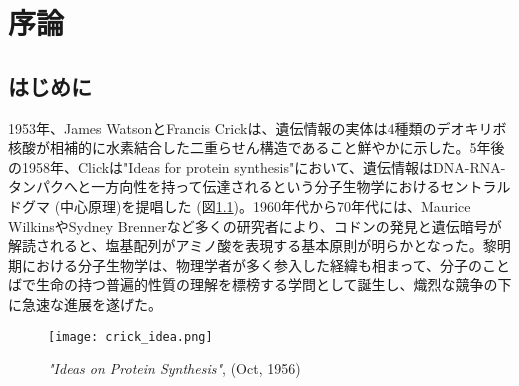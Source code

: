 \chapter{序論}

\section{はじめに}
1953年、James WatsonとFrancis Crickは、遺伝情報の実体は4種類のデオキリボ核酸が相補的に水素結合した二重らせん構造であること鮮やかに示した。5年後の1958年、Clickは"Ideas for protein synthesis"において、遺伝情報はDNA-RNA-タンパクへと一方向性を持って伝達されるという分子生物学におけるセントラルドグマ (中心原理)を提唱した (図\ref{fig:crick_idea})。1960年代から70年代には、Maurice WilkinsやSydney Brennerなど多くの研究者により、コドンの発見と遺伝暗号が解読されると、塩基配列がアミノ酸を表現する基本原則が明らかとなった。黎明期における分子生物学は、物理学者が多く参入した経緯も相まって、分子のことばで生命の持つ普遍的性質の理解を標榜する学問として誕生し、熾烈な競争の下に急速な進展を遂げた。

\begin{figure}[!h]
	\begin{center}
		\texttt{[image: crick\_idea.png]}
	\end{center}
	\caption{\textit{"Ideas on Protein Synthesis"}, (Oct, 1956)}
	\label{fig:crick_idea}
\end{figure}


